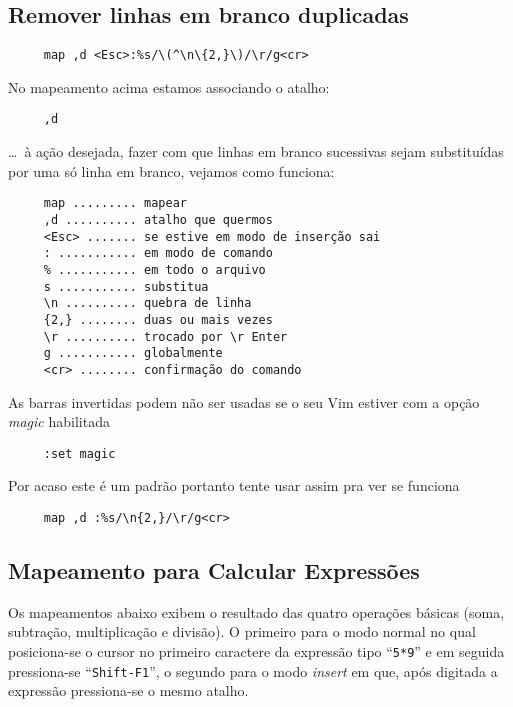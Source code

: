 \subsection{Remover linhas em branco duplicadas }
\label{Remover linhas em branco duplicadas }

\begin{verbatim}
     map ,d <Esc>:%s/\(^\n\{2,}\)/\r/g<cr>
\end{verbatim}

No mapeamento acima estamos associando o atalho:

\begin{verbatim}
     ,d
\end{verbatim}

\dots~à ação desejada, fazer com que linhas em branco sucessivas sejam
substituídas por uma só linha em branco, vejamos como funciona:

\begin{verbatim}
     map ......... mapear
     ,d .......... atalho que quermos
     <Esc> ....... se estive em modo de inserção sai
     : ........... em modo de comando
     % ........... em todo o arquivo
     s ........... substitua
     \n .......... quebra de linha
     {2,} ........ duas ou mais vezes
     \r .......... trocado por \r Enter
     g ........... globalmente
     <cr> ........ confirmação do comando
\end{verbatim}

As barras invertidas podem não ser usadas se o seu Vim estiver com a opção
{\em magic} habilitada

\begin{verbatim}
     :set magic
\end{verbatim}

Por acaso este é um padrão portanto tente usar assim pra ver se funciona

\begin{verbatim}
     map ,d :%s/\n{2,}/\r/g<cr>
\end{verbatim}

\subsection{Mapeamento para Calcular Expressões}
\label{sub:Mapeamento para Calcular Expressões}

Os mapeamentos abaixo exibem o resultado das quatro operações básicas (soma,
subtração, multiplicação e divisão). O primeiro para o modo normal no qual
posiciona-se o cursor no primeiro caractere da expressão tipo ``{\tt 5*9}'' e em
seguida pressiona-se ``{\tt Shift-F1}'', o segundo para o modo {\em insert} em que, após
digitada a expressão pressiona-se o mesmo atalho.

